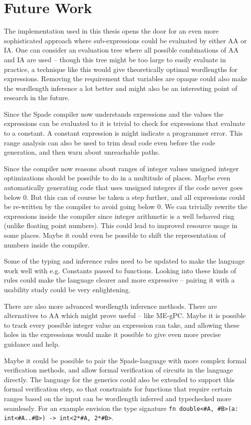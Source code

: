 \chapter{Future Work}
The implementation used in this thesis opens the door for an even more sophisticated approach where sub-expressions could be evaluated by either AA or IA. One can consider an evaluation tree where all possible combinations of AA and IA are used -- though this tree might be too large to easily evaluate in practice, a technique like this would give theoretically optimal wordlengths for expressions. Removing the requirement that variables are opaque could also make the wordlength inference a lot better and might also be an interesting point of research in the future.

Since the Spade compiler now understands expressions and the values the expressions can be evaluated to it is trivial to check for expressions that evaluate to a constant. A constant expression is might indicate a programmer error. This range analysis can also be used to trim dead code even before the code generation, and then warn about unreachable paths.

Since the compiler now reasons about ranges of integer values unsigned integer optimizations should be possible to do in a multitude of places. Maybe even automatically generating code that uses unsigned integers if the code never goes below 0. But this can of course be taken a step further, and all expressions could be re-written by the compiler to avoid going below 0. We can trivially rewrite the expressions inside the compiler since integer arithmetic is a well behaved ring (unlike floating point numbers). This could lead to improved resource usage in some places. Maybe it could even be possible to shift the representation of numbers inside the compiler.

Some of the typing and inference rules need to be updated to make the language work well with e.g. Constants passed to functions. Looking into these kinds of rules could make the language clearer and more expressive -- pairing it with a usability study could be very enlightening.

There are also more advanced wordlength inference methods. There are alternatives to AA which might prove useful -- like ME-gPC. Maybe it is possible to track every possible integer value an expression can take, and allowing these holes in the expressions would make it possible to give even more precise guidance and help.

Maybe it could be possible to pair the Spade-language with more complex formal verification methods, and allow formal verification of circuits in the language directly. The language for the generics could also be extended to support this formal verification step, so that constraints for functions that require certain ranges based on the input can be wordlength inferred and typechecked more seamlessly. For an example envision the type signature \verb+fn double<#A, #B>(a: int<#A..#B>) -> int<2*#A, 2*#B>+.

